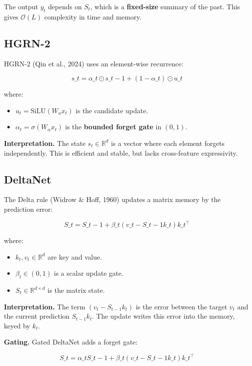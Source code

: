 The output $y_t$ depends on $S_t$, which is a \textbf{fixed-size} summary of the 
past. This gives $\mathcal{O}(L)$ complexity in time and memory.

\subsection{HGRN-2}

HGRN-2 (Qin et al., 2024) uses an element-wise recurrence:

\[
s\_t = \alpha\_t \odot s\_{t-1} + (1 - \alpha\_t) \odot u\_t
\tag{3.2}
\]

where:

\begin{itemize}
\item $u_t = \text{SiLU}(W_u x_t)$ is the candidate update.
\item $\alpha_t = \sigma(W_\alpha x_t)$ is the \textbf{bounded forget gate} in $(0, 1)$.

\end{itemize}
\textbf{Interpretation.} The state $s_t \in \mathbb{R}^d$ is a vector where each 
element forgets independently. This is efficient and stable, but lacks 
cross-feature expressivity.

\subsection{DeltaNet}

The Delta rule (Widrow \& Hoff, 1960) updates a matrix memory by the 
prediction error:

\[
S\_t = S\_{t-1} + \beta\_t (v\_t - S\_{t-1} k\_t) k\_t^\top
\tag{3.3}
\]

where:

\begin{itemize}
\item $k_t, v_t \in \mathbb{R}^d$ are key and value.
\item $\beta_t \in (0, 1)$ is a scalar update gate.
\item $S_t \in \mathbb{R}^{d \times d}$ is the matrix state.

\end{itemize}
\textbf{Interpretation.} The term $(v_t - S_{t-1} k_t)$ is the error between the 
target $v_t$ and the current prediction $S_{t-1} k_t$. The update writes this 
error into the memory, keyed by $k_t$.

\textbf{Gating.} Gated DeltaNet adds a forget gate:

\[
S\_t = \alpha\_t S\_{t-1} + \beta\_t (v\_t - S\_{t-1} k\_t) k\_t^\top
\tag{3.4}
\]

